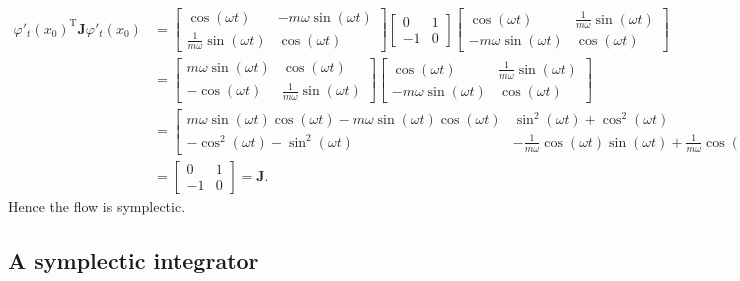 \begin{align*}
	\varphi'_t(x_0)^\mathrm{T} \mathbf{J} \varphi'_t(x_0) &= \begin{bmatrix}
		\cos(\omega t) & -m\omega \sin(\omega t) \\
		\frac{1}{m\omega} \sin(\omega t) & \cos(\omega t)
	\end{bmatrix} \begin{bmatrix}
		0 & 1 \\
		-1 & 0
	\end{bmatrix} \begin{bmatrix}
		\cos(\omega t) & \frac{1}{m\omega} \sin(\omega t) \\
		-m\omega \sin(\omega t) & \cos(\omega t)
	\end{bmatrix} \\
	&= \begin{bmatrix}
		m \omega \sin(\omega t) & \cos(\omega t) \\
		-\cos(\omega t) & \frac{1}{m \omega} \sin(\omega t)
	\end{bmatrix} \begin{bmatrix}
		\cos(\omega t) & \frac{1}{m\omega} \sin(\omega t) \\
		-m\omega \sin(\omega t) & \cos(\omega t)
	\end{bmatrix} \\
	&= \begin{bmatrix}
		m \omega \sin(\omega t) \cos(\omega t) - m \omega \sin(\omega t) \cos(\omega t)  & \sin^2(\omega t) + \cos^2(\omega t) \\
		-\cos^2(\omega t) - \sin^2(\omega t) & -\frac{1}{m\omega}\cos(\omega t)\sin(\omega t) + \frac{1}{m \omega}\cos(\omega t)\sin(\omega t)
	\end{bmatrix} \\
	&= \begin{bmatrix}
		0 & 1 \\
		-1 & 0
	\end{bmatrix} = \mathbf{J}.
\end{align*}
Hence the flow is symplectic.

\subsection{A symplectic integrator}

